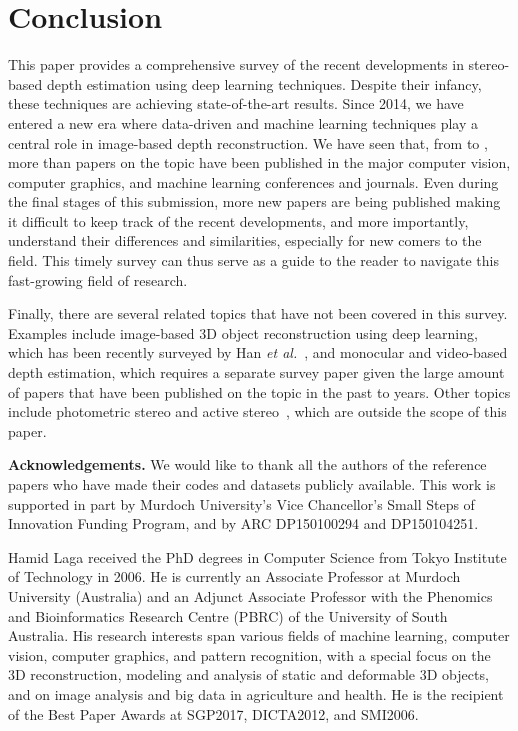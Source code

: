 \documentclass[10pt,journal,compsoc]{IEEEtran}
\newcommand{\etal}{\emph{et al.}}
\newcommand{\noi}{\noindent}
\begin{document}
\section{Conclusion}
\label{sec:conclusion}

This paper provides a comprehensive survey of the recent developments in stereo-based depth estimation using deep learning techniques.  Despite their infancy, these techniques are achieving state-of-the-art  results.  Since 2014, we have entered a new era where data-driven and machine learning techniques play a central role in image-based depth reconstruction. We have seen that, from  to , more than  papers on the topic have been published in the major computer vision, computer graphics,  and machine learning conferences and journals.  Even during the   final stages of this submission, more new papers are being published making it difficult to keep track of the recent developments, and more importantly, understand their differences and similarities, especially for new comers to the field. This timely survey  can thus serve as a guide to the reader to navigate this fast-growing field of research. 

Finally, there are several related topics that have not been covered in this survey. Examples include image-based 3D object reconstruction using deep learning, which has been recently surveyed by Han \etal~\cite{han2020image}, and monocular and video-based depth estimation, which requires a separate survey paper given the large amount of papers that have been published on the topic in the past  to  years. Other topics  include photometric stereo and active stereo~\cite{Haefner_2019_ICCV,Zheng_2019_ICCV}, which are outside the scope of this paper.


\small{
\vspace{6pt}
\noi\textbf{Acknowledgements. }  We would like to thank all the authors of the reference papers who have made their codes and datasets publicly available. This work is supported in part by Murdoch University's Vice Chancellor's Small Steps of Innovation Funding Program, and by ARC DP150100294 and DP150104251. 
}










\begin{IEEEbiography}{Hamid Laga}  received the PhD degrees in Computer Science from Tokyo Institute of Technology in 2006. He is currently  an Associate Professor at Murdoch University (Australia) and an Adjunct Associate Professor with the Phenomics and Bioinformatics Research Centre (PBRC) of the University of South Australia. His research interests span various fields of machine learning, computer vision, computer graphics, and pattern recognition, with a special focus on the 3D reconstruction, modeling and analysis of static and deformable 3D objects, and on image analysis and big data in agriculture and health. He is the recipient of  the Best Paper Awards at SGP2017, DICTA2012, and SMI2006.
\end{IEEEbiography}
\end{document}
